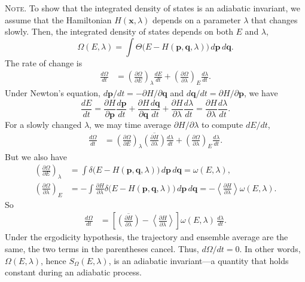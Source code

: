 \documentclass[reprint]{revtex4-1}
\newcommand{\note}[1]{{\color{DarkGreen}\footnotesize \textsc{Note.} #1}}
\begin{document}
\note{
  To show that
  the integrated density of states
  is an adiabatic invariant,
  we assume that
  the Hamiltonian $H(\mathbf x, \lambda)$
  depends on a parameter $\lambda$
  that changes slowly.
  Then, the integrated density of states
  depends on both $E$ and $\lambda$,
  $$
  \Omega(E, \lambda)
  =
  \int \Theta\bigl(
    E - H(\mathbf p, \mathbf q, \lambda)
  \bigr)
  \, d\mathbf p \, d\mathbf q
  .
  $$
  The rate of change is
  \begin{align*}
  \frac{ d \Omega } { dt }
  &=
  \left(
    \frac{ \partial \Omega } { \partial E }
  \right)_\lambda
  \frac{ dE } { dt }
  +
  \left(
    \frac{ \partial \Omega } { \partial \lambda }
  \right)_E
  \frac{ d\lambda } { dt }
  .
  \end{align*}
  Under Newton's equation,
  $d\mathbf p/dt = -\partial H/\partial \mathbf q$
  and
  $d\mathbf q/dt = \partial H/\partial \mathbf p$,
  we have
  $$
  \frac{ dE } { dt }
  =
  \frac{ \partial H } { \partial \mathbf p }
  \frac{ d \mathbf p } { d t }
  +
  \frac{ \partial H } { \partial \mathbf q }
  \frac{ d \mathbf q } { d t }
  +
  \frac{ \partial H } { \partial \lambda }
  \frac{ d \lambda } { dt }
  =
  \frac{ \partial H } { \partial \lambda }
  \frac{ d \lambda } { dt }
  .
  $$
  For a slowly changed $\lambda$,
  we may time average $\partial H / \partial \lambda$
  to compute $dE/dt$,
  \begin{align*}
  \frac{ d \Omega } { dt }
  &=
  \left(
    \frac{ \partial \Omega } { \partial E }
  \right)_\lambda
  \overline{
    \left(
    \frac{ \partial H } { \partial \lambda }
    \right)
  }
  \frac{ d\lambda } { dt }
  +
  \left(
    \frac{ \partial \Omega } { \partial \lambda }
  \right)_E
  \frac{ d\lambda } { dt }
  .
  \end{align*}
  But we also have
  \begin{align*}
  \left(
    \frac{ \partial \Omega } { \partial E }
  \right)_\lambda
  &=
  \int
  \delta\bigl(
    E - H(\mathbf p, \mathbf q, \lambda)
  \bigr)
  \, d\mathbf p \, d\mathbf q
  =
  \omega(E, \lambda)
  ,
  \\
  \left(
    \frac{ \partial \Omega } { \partial \lambda }
  \right)_E
  &=
  -\int
  \frac{ \partial H } { \partial \lambda }
  \delta\bigl(
    E - H(\mathbf p, \mathbf q, \lambda)
  \bigr)
  \, d\mathbf p \, d\mathbf q
  =
  -\left\langle
    \frac{ \partial H } { \partial \lambda }
  \right\rangle
  \omega(E, \lambda)
  .
  \end{align*}
  So
  \begin{align*}
  \frac{ d \Omega } { dt }
  &=
  \left[
    \overline{
      \left(
        \frac{ \partial H } { \partial \lambda }
      \right)
    }
    -
    \left\langle
      \frac{ \partial H } { \partial \lambda }
    \right\rangle
  \right]
  \omega(E, \lambda) \,
  \frac{ d\lambda } { dt }
  .
  \end{align*}
  Under the ergodicity hypothesis,
  the trajectory and ensemble average
  are the same,
  the two terms in the parentheses cancel.
  Thus, $d\Omega/dt = 0$.
  In other words,
  $\Omega(E, \lambda)$, hence $S_\Omega(E, \lambda)$,
  is an adiabatic invariant---a quantity that holds constant
  during an adiabatic process.
}
\end{document}
